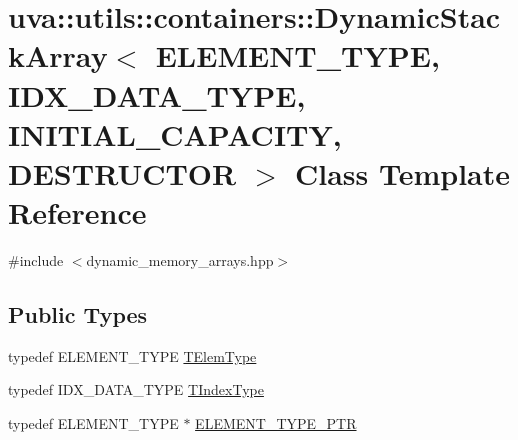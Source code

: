 \hypertarget{classuva_1_1utils_1_1containers_1_1_dynamic_stack_array}{}\section{uva\+:\+:utils\+:\+:containers\+:\+:Dynamic\+Stack\+Array$<$ E\+L\+E\+M\+E\+N\+T\+\_\+\+T\+Y\+P\+E, I\+D\+X\+\_\+\+D\+A\+T\+A\+\_\+\+T\+Y\+P\+E, I\+N\+I\+T\+I\+A\+L\+\_\+\+C\+A\+P\+A\+C\+I\+T\+Y, D\+E\+S\+T\+R\+U\+C\+T\+O\+R $>$ Class Template Reference}
\label{classuva_1_1utils_1_1containers_1_1_dynamic_stack_array}


{\ttfamily \#include $<$dynamic\+\_\+memory\+\_\+arrays.\+hpp$>$}

\subsection*{Public Types}
\begin{DoxyCompactItemize}
\item 
typedef E\+L\+E\+M\+E\+N\+T\+\_\+\+T\+Y\+P\+E \hyperlink{classuva_1_1utils_1_1containers_1_1_dynamic_stack_array_ac994c5aa3fa4d7fadf187a81f41a009d}{T\+Elem\+Type}
\item 
typedef I\+D\+X\+\_\+\+D\+A\+T\+A\+\_\+\+T\+Y\+P\+E \hyperlink{classuva_1_1utils_1_1containers_1_1_dynamic_stack_array_a2248ed51238b917fabf5cec6bec1f25c}{T\+Index\+Type}
\item 
typedef E\+L\+E\+M\+E\+N\+T\+\_\+\+T\+Y\+P\+E $\ast$ \hyperlink{classuva_1_1utils_1_1containers_1_1_dynamic_stack_array_a89639cff2e067a979ee9076caeb03a76}{E\+L\+E\+M\+E\+N\+T\+\_\+\+T\+Y\+P\+E\+\_\+\+P\+T\+R}
\end{DoxyCompactItemize}
